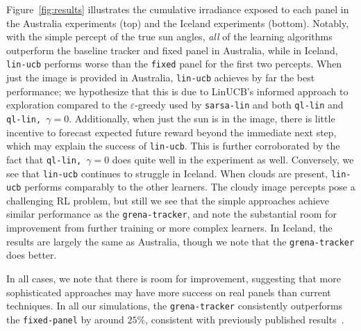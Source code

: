\documentclass{article}
\begin{document}


Figure~\ref{fig:results} illustrates the cumulative irradiance exposed to each panel in the Australia experiments (top) and the Iceland experiments (bottom). Notably, with the simple percept of the true sun angles, {\it all} of the learning algorithms outperform the baseline tracker and fixed panel in Australia, while in Iceland, \texttt{lin-ucb} performs worse than the \texttt{fixed} panel for the first two percepts. When just the image is provided in Australia, \texttt{lin-ucb} achieves by far the best performance; we hypothesize that this is due to LinUCB's informed approach to exploration compared to the $\varepsilon$-greedy used by \texttt{sarsa-lin} and both \texttt{ql-lin} and \texttt{ql-lin, $\gamma=0$}. Additionally, when just the sun is in the image, there is little incentive to forecast expected future reward beyond the immediate next step, which may explain the success of \texttt{lin-ucb}. This is further corroborated by the fact that \texttt{ql-lin, $\gamma=0$} does quite well in the experiment as well. Conversely, we see that \texttt{lin-ucb} continues to struggle in Iceland. When clouds are present, \texttt{lin-ucb} performs comparably to the other learners. The cloudy image percepts pose a challenging RL problem, but still we see that the simple approaches achieve similar performance as the \texttt{grena-tracker}, and note the substantial room for improvement from further training or more complex learners. In Iceland, the results are largely the same as Australia, though we note that the \texttt{grena-tracker} does better. 


In all cases, we note that there is room for improvement, suggesting that more sophisticated approaches may have more success on real panels than current techniques. In all our simulations, the \texttt{grena-tracker} consistently outperforms the \texttt{fixed-panel} by around $25\%$, consistent with previously published results~\cite{Eke2012,mousazadeh2009review,clifford2004design}. %
\end{document}
